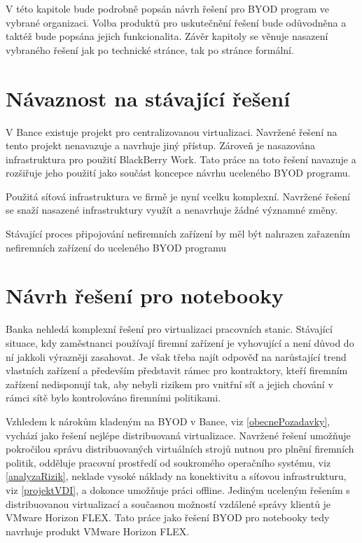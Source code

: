 
V této kapitole bude podrobně popsán návrh řešení pro BYOD program ve vybrané organizaci. Volba produktů pro uskutečnění řešení bude odůvodněna a taktéž bude popsána jejich funkcionalita. Závěr kapitoly se věnuje nasazení vybraného řešení jak po technické stránce, tak po stránce formální. 


\section{Návaznost na stávající řešení}
V Bance existuje projekt pro centralizovanou virtualizaci. Navržené řešení na tento projekt nenavazuje a navrhuje jiný přístup. Zároveň je nasazována infrastruktura pro použití BlackBerry Work. Tato práce na toto řešení navazuje a rozšiřuje jeho použití jako součást koncepce návrhu uceleného BYOD programu. 

Použitá síťová infrastruktura ve firmě je nyní vcelku komplexní. Navržené řešení se snaží nasazené infrastruktury využít a nenavrhuje žádné významné změny. 

Stávající proces připojování nefiremních zařízení by měl být nahrazen zařazením nefiremních zařízení do uceleného BYOD programu


\section{Návrh řešení pro notebooky}

Banka nehledá komplexní řešení pro virtualizaci pracovních stanic. Stávající situace, kdy zaměstnanci používají firemní zařízení je vyhovující a není důvod do ní jakkoli výrazněji zasahovat. Je však třeba najít odpověď na narůstající trend vlastních zařízení a především představit rámec pro kontraktory, kteří firemním zařízení nedisponují tak, aby nebyli rizikem pro vnitřní síť a jejich chování v rámci sítě bylo kontrolováno firemními politikami.


Vzhledem k nárokům kladeným na BYOD v Bance, viz \ref{obecnePozadavky}, vychází jako řešení nejlépe distribuovaná virtualizace. Navržené řešení umožňuje pokročilou správu distribuovaných virtuálních strojů nutnou pro plnění firemních politik, odděluje pracovní prostředí od soukromého operačního systému, viz \ref{analyzaRizik}, neklade vysoké náklady na konektivitu a síťovou infrastrukturu, viz \ref{projektVDI}, a dokonce umožňuje práci offline. Jediným uceleným řešením s distribuovanou virtualizací a současnou možností vzdálené správy klientů je  VMware Horizon FLEX. Tato práce jako řešení BYOD pro notebooky tedy navrhuje produkt VMware Horizon FLEX.



